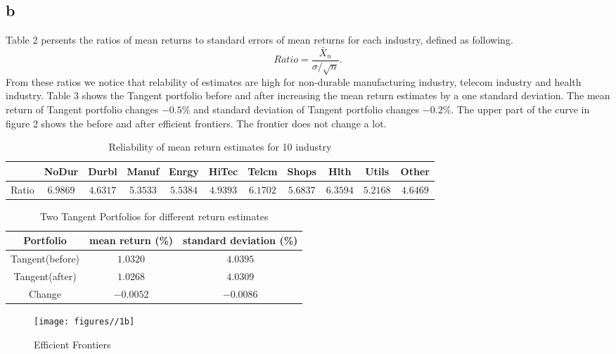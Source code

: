 \documentclass{report}
\begin{document}
\subsection{b}
Table 2 persents the ratios of mean returns to standard errors of mean returns for each industry, defined as following.
\[ Ratio = \frac{ \bar{X}_{n}}{ \sigma /\sqrt{n}} .\]
From these ratios we notice that relability of estimates are high for non-durable manufacturing industry, telecom industry and health industry. Table 3 shows the Tangent portfolio before and after increasing the mean return estimates by a one standard deviation. The mean return of Tangent portfolio changes $ -0.5 \% $ and standard deviation of Tangent portfolio changes $ -0.2\% $.  The upper part of the curve in figure 2 shows the before and after efficient frontiers. The frontier does not change a lot.
\begin{table}[H]
\centering
\begin{tabular}{|c|c|c|c|c|c|c|c|c|c|c|}
\hline
&NoDur & Durbl & Manuf & Enrgy & HiTec & Telcm & Shops & Hlth & Utils & Other\\
\hline
Ratio& $6.9869$ & $4.6317$ & $5.3533$ & $5.5384$ & $4.9393$ & $6.1702$ & $5.6837$ & $6.3594$ & $5.2168$ & $4.6469$ \\
\hline
\end{tabular}
\caption{ Reliability of mean return estimates for 10 industry}
\end{table}
\begin{table}[H]
\centering
\begin{tabular}{|c|c|c|}
\hline
Portfolio&mean return (\%) &standard deviation (\%)\\
\hline
Tangent(before)& $1.0320$ & $4.0395$ \\
\hline
Tangent(after)& $1.0268$ & $4.0309$ \\
\hline
Change & $-0.0052$ & $-0.0086$ \\
\hline
\end{tabular}
\caption{ Two Tangent Portfolios for different return estimates}
\end{table}
\begin{figure}[H]
        \centering 
         \texttt{[image: figures//1b]}
         \caption{ Efficient Frontiers}
\end{figure}
\end{document}
